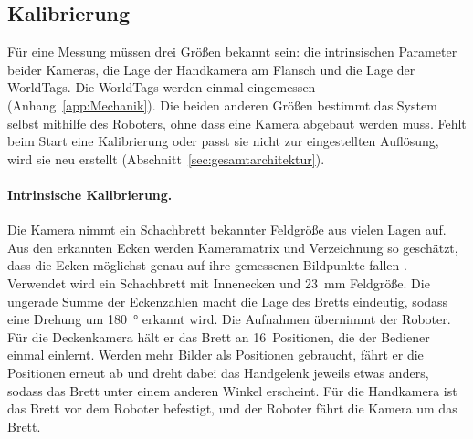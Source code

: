 \subsection{Kalibrierung}
\label{subsec:bv-kalibrierung}
Für eine Messung müssen drei Größen bekannt sein: die intrinsischen Parameter beider Kameras, die Lage der Handkamera am Flansch und die Lage der WorldTags. Die WorldTags werden einmal eingemessen (Anhang~\ref{app:Mechanik}). Die beiden anderen Größen bestimmt das System selbst mithilfe des Roboters, ohne dass eine Kamera abgebaut werden muss. Fehlt beim Start eine Kalibrierung oder passt sie nicht zur eingestellten Auflösung, wird sie neu erstellt (Abschnitt~\ref{sec:gesamtarchitektur}).

\paragraph{Intrinsische Kalibrierung.}
Die Kamera nimmt ein Schachbrett bekannter Feldgröße aus vielen Lagen auf. Aus den erkannten Ecken werden Kameramatrix und Verzeichnung so geschätzt, dass die Ecken möglichst genau auf ihre gemessenen Bildpunkte fallen \cite{Zhang2000}. Verwendet wird ein Schachbrett mit  Innenecken und \SI{23}{\milli\metre} Feldgröße. Die ungerade Summe der Eckenzahlen macht die Lage des Bretts eindeutig, sodass eine Drehung um \SI{180}{\degree} erkannt wird. Die Aufnahmen übernimmt der Roboter. Für die Deckenkamera hält er das Brett an 16~Positionen, die der Bediener einmal einlernt. Werden mehr Bilder als Positionen gebraucht, fährt er die Positionen erneut ab und dreht dabei das Handgelenk jeweils etwas anders, sodass das Brett unter einem anderen Winkel erscheint. Für die Handkamera ist das Brett vor dem Roboter befestigt, und der Roboter fährt die Kamera um das Brett.

